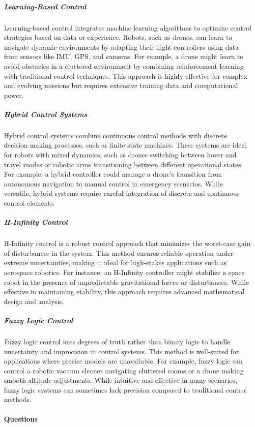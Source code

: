 \documentclass{book}
\begin{document}
\subparagraph{Learning-Based Control}
Learning-based control integrates machine learning algorithms to optimize control strategies based on data or experience. Robots, such as drones, can learn to navigate dynamic environments by adapting their flight controllers using data from sensors like IMU, GPS, and cameras. For example, a drone might learn to avoid obstacles in a cluttered environment by combining reinforcement learning with traditional control techniques. This approach is highly effective for complex and evolving missions but requires extensive training data and computational power.

\subparagraph{Hybrid Control Systems}
Hybrid control systems combine continuous control methods with discrete decision-making processes, such as finite state machines. These systems are ideal for robots with mixed dynamics, such as drones switching between hover and travel modes or robotic arms transitioning between different operational states. For example, a hybrid controller could manage a drone's transition from autonomous navigation to manual control in emergency scenarios. While versatile, hybrid systems require careful integration of discrete and continuous control elements.

\subparagraph{H-Infinity Control}
H-Infinity control is a robust control approach that minimizes the worst-case gain of disturbances in the system. This method ensures reliable operation under extreme uncertainties, making it ideal for high-stakes applications such as aerospace robotics. For instance, an H-Infinity controller might stabilize a space robot in the presence of unpredictable gravitational forces or disturbances. While effective in maintaining stability, this approach requires advanced mathematical design and analysis.

\subparagraph{Fuzzy Logic Control}
Fuzzy logic control uses degrees of truth rather than binary logic to handle uncertainty and imprecision in control systems. This method is well-suited for applications where precise models are unavailable. For example, fuzzy logic can control a robotic vacuum cleaner navigating cluttered rooms or a drone making smooth altitude adjustments. While intuitive and effective in many scenarios, fuzzy logic systems can sometimes lack precision compared to traditional control methods.

\paragraph{Questions}
\end{document}
